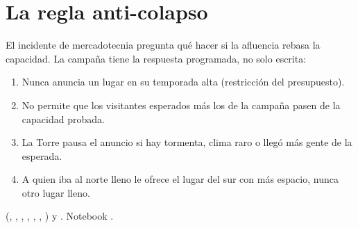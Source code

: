 \section{La regla anti-colapso}
El incidente de mercadotecnia pregunta qué hacer si la afluencia rebasa la capacidad. La campaña tiene la respuesta
programada, no solo escrita:
\begin{enumerate}
\item Nunca anuncia un lugar en su temporada alta (restricción del presupuesto).
\item No permite que los visitantes esperados más los de la campaña pasen de la capacidad probada.
\item La Torre pausa el anuncio si hay tormenta, clima raro o llegó más gente de la esperada.
\item A quien iba al norte lleno le ofrece el lugar del sur con más espacio, nunca otro lugar lleno.
\end{enumerate}

\begin{codigoen} (, , , ,
, , ) y . Notebook .\end{codigoen}
